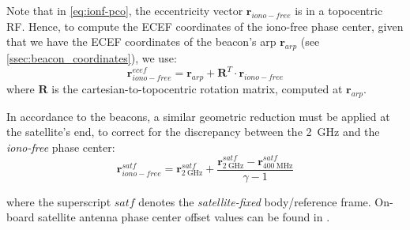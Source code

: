 Note that in \ref{eq:ionf-pco}, the eccentricity vector $\bm{r}_{iono-free}$ 
is in a topocentric RF. Hence, to compute the ECEF coordinates of the 
iono-free phase center, given that we have the ECEF coordinates of the beacon's 
\gls{arp} $\bm{r}_{arp}$ (see \ref{ssec:beacon_coordinates}), we use:
\begin{equation}
  \bm{r}^{ecef}_{iono-free} = \bm{r}_{arp} + \bm{R}^T \cdot \bm{r}_{iono-free}
\end{equation}
where $\bm{R}$ is the cartesian-to-topocentric rotation matrix, computed 
at $\bm{r}_{arp}$.

In accordance to the beacons, a similar geometric reduction must be applied 
at the satellite's end, to correct for the discrepancy between the \SI{2}{\GHz} 
and the \emph{iono-free} phase center:
\begin{equation}
  \bm{r}^{satf}_{iono-free} = \bm{r}^{satf}_{\SI{2}{\GHz}} + 
    \frac{\bm{r}^{satf}_{\SI{2}{\GHz}} - 
    \bm{r}^{satf}_{\SI{400}{\MHz}}}{\gamma - 1}
\end{equation}

where the superscript $satf$ denotes the \emph{satellite-fixed} body/reference 
frame. On-board satellite antenna phase center offset values can be found in 
\cite{DorisSatModels}.
